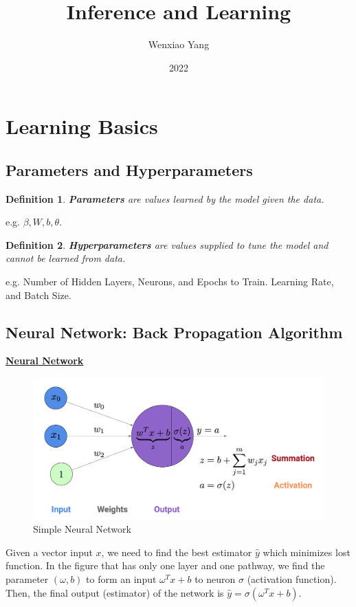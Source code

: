 \documentclass[11pt,a4paper]{article}
\title{Inference and Learning}
\author[*]{Wenxiao Yang}
\affil[*]{Department of Mathematics, University of Illinois at Urbana-Champaign}
\date{2022}
\newtheorem{definition}{Definition}
\begin{document}
\maketitle
\tableofcontents
\newpage

\section{Learning Basics}
\subsection{Parameters and Hyperparameters}
\begin{definition}
    \textbf{Parameters} are values learned by the model given the data.
\end{definition}
e.g. $\beta, W, b, \theta$.
\begin{definition}
    \textbf{Hyperparameters} are values supplied to tune the model and cannot be learned from data.
\end{definition}
e.g. Number of Hidden Layers, Neurons, and Epochs to Train. Learning Rate, and Batch Size.

\subsection{Neural Network: Back Propagation Algorithm}
\underline{\textbf{Neural Network}}
\begin{center}\begin{figure}[htbp]
    \centering
    \includegraphics[scale=0.2]{neuron1.png}
    \caption{Simple Neural Network}
    \label{}
\end{figure}\end{center}
Given a vector input $x$, we need to find the best estimator $\hat{y}$ which minimizes lost function. In the figure that has only one layer and one pathway, we find the parameter $(\omega,b)$ to form an input $\omega^Tx+b$ to neuron $\sigma$ (activation function).  Then, the final output (estimator) of the network is $\hat{y}=\sigma(\omega^Tx+b)$.
\end{document}
